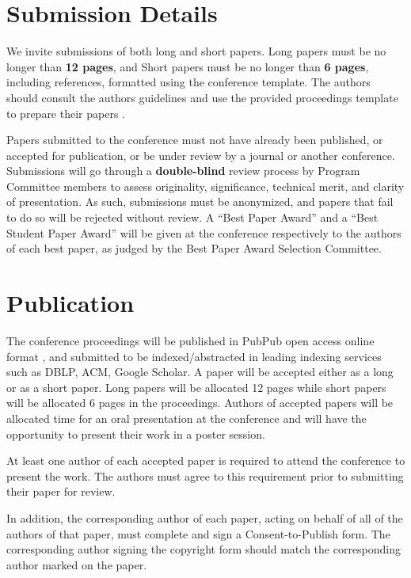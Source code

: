 \documentclass[10pt]{cai}
\begin{document}
\section{Submission Details}
\label{submission}
We invite submissions of both long and short papers. Long papers must be no longer than \textbf{12 pages}, and Short papers must be no longer than \textbf{6 pages}, including references, formatted using the conference template. The authors should consult the authors guidelines and use the provided proceedings template to prepare their papers  \cite{cai2020,author1_name_author_2020}.

Papers submitted to the conference must not have already been published, or accepted for publication, or be under review by a journal or another conference. Submissions will go through a \textbf{double-blind} review process by Program Committee members to assess originality, significance, technical merit, and clarity of presentation. As such, submissions must be anonymized, and papers that fail to do so will be rejected without review.  A “Best Paper Award” and a “Best Student Paper Award” will be given at the conference respectively to the authors of each best paper, as judged by the Best Paper Award Selection Committee.

\section{Publication}
\label{pub}

The conference proceedings will be published in PubPub open access online format \cite{pubpub2020}, and submitted to be indexed/abstracted in leading indexing services such as DBLP, ACM, Google Scholar. A paper will be accepted either as a long or as a short paper. Long papers will be allocated 12 pages while short papers will be allocated 6 pages in the proceedings. Authors of accepted papers will be allocated time for an oral presentation at the conference and will have the opportunity to present their work in a poster session. 

At least one author of each accepted paper is required to attend the conference to present the work. The authors must agree to this requirement prior to submitting their paper for review.

In addition, the corresponding author of each paper, acting on behalf of all of the authors of that paper, must complete and sign a Consent-to-Publish form. The corresponding author signing the copyright form should match the corresponding author marked on the paper.
\end{document}
